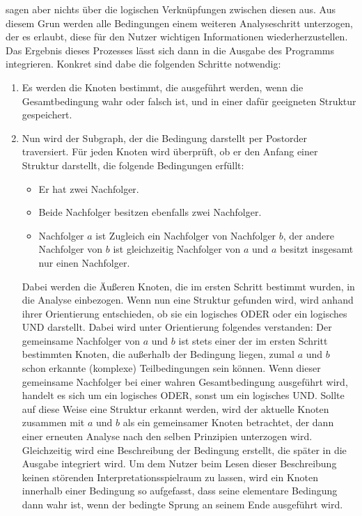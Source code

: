 \documentclass[11pt]{article}
\begin{document}
\begin{enumerate}
		sagen aber nichts über die logischen Verknüpfungen zwischen diesen aus. Aus diesem
		Grun werden alle Bedingungen einem weiteren Analyseschritt unterzogen, der es erlaubt,
		diese für den Nutzer wichtigen Informationen wiederherzustellen. Das Ergebnis dieses
		Prozesses lässt sich dann in die Ausgabe des Programms integrieren. Konkret sind dabe
		die folgenden Schritte notwendig:
		\begin{enumerate}
			\item{Es werden die Knoten bestimmt, die ausgeführt werden, wenn die Gesamtbedingung
				wahr oder falsch ist, und in einer dafür geeigneten Struktur gespeichert.}
			\item{Nun wird der Subgraph, der die Bedingung darstellt per Postorder traversiert.
				Für jeden Knoten wird überprüft, ob er den Anfang einer Struktur darstellt,
				die folgende Bedingungen erfüllt:
				\begin{itemize}
					\item{Er hat zwei Nachfolger.}
					\item{Beide Nachfolger besitzen ebenfalls zwei Nachfolger.}
					\item{Nachfolger $a$ ist Zugleich ein Nachfolger von
						Nachfolger $b$, der andere Nachfolger von $b$ ist
						gleichzeitig Nachfolger von $a$ und $a$ besitzt insgesamt
					        nur einen Nachfolger.}
				\end{itemize}
				Dabei werden die Äußeren Knoten, die im ersten Schritt bestimmt wurden, in
				die Analyse einbezogen. Wenn nun eine Struktur gefunden wird, wird anhand
				ihrer Orientierung entschieden, ob sie ein logisches ODER oder ein logisches
				UND darstellt. Dabei wird unter Orientierung folgendes verstanden: Der
				gemeinsame Nachfolger von $a$ und $b$ ist stets einer der im ersten Schritt
				bestimmten Knoten, die außerhalb der Bedingung liegen, zumal $a$ und $b$
				schon erkannte (komplexe) Teilbedingungen sein können. Wenn dieser gemeinsame
				Nachfolger bei einer wahren Gesamtbedingung ausgeführt wird, handelt es sich
				um ein logisches ODER, sonst um ein logisches UND. Sollte auf diese Weise eine
				Struktur erkannt werden, wird der aktuelle Knoten zusammen mit $a$ und $b$
				als ein gemeinsamer Knoten betrachtet, der dann einer erneuten Analyse nach
				den selben Prinzipien unterzogen wird. Gleichzeitig wird eine Beschreibung
				der Bedingung erstellt, die später in die Ausgabe integriert wird.
				Um dem Nutzer beim Lesen dieser Beschreibung keinen störenden
				Interpretationsspielraum zu lassen, wird ein Knoten innerhalb einer Bedingung
				so aufgefasst, dass seine elementare Bedingung dann wahr ist, wenn der
				bedingte Sprung an seinem Ende ausgeführt wird.}
		\end{enumerate}
\end{enumerate}
\end{document}
